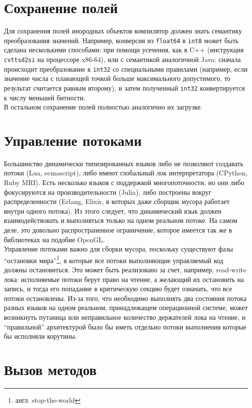 \documentclass[times,specification,annotation]{itmo-student-thesis}
\begin{document}
\section{Сохранение полей}
Для сохранения полей инородных объектов компилятор должен знать семантику преобразования значений. Например, конверсия из \texttt{float64} в \texttt{int8} может быть сделана несколькими способами: при помощи усечения, как в C++ (инструкция \texttt{cvttsd2si} на процессоре x86-64), или с семантикой аналогичной Java: сначала происходит преобразование к \texttt{int32} со специальными правилами (например, если значение числа с плавающей точкой больше максимального допустимого, то результат считается равным второму), и затем полученный \texttt{int32} конвертируется к числу меньшей битности.\\
В остальном сохранение полей полностью аналогично их загрузке.

\section{Управление потоками} \label{sec:thread-management}
Большинство динамически типизированных языков либо не позволяют создавать потоки (Lua, ecmascript), либо имеют глобальный лок интерпретатора (CPython, Ruby MRI). Есть несколько языков с поддержкой многопоточности, но они либо фокусируются на производительности (Julia), либо построены вокруг распределенности (Erlang, Elixir, в которых даже сборщик мусора работает внутри одного потока). Из этого следует, что динамический язык должен взаимодействовать и выполняться только на одном реальном потоке. На самом деле, это довольно распространенное ограничение, которое имеется так же в библиотеках на подобие OpenGL.\\
Управление потоками важно для сборки мусора, поскольку существуют фазы ``остановки мира''\footnote{англ. stop-the-world}, в которые все потоки выполняющие управляемый код должны остановиться. Это может быть реализовано за счет, например, read-write лока: исполняемые потоки берут право на чтение, а желающий их остановить на запись, и тогда его попадание в критическую секцию будет означать, что все потоки остановлены. Из-за того, что необходимо выполнять два состояния потока разных языков на одном реальном, принадлежащем операционной системе, может возникнуть путаница или неправильное количество держателей лока на чтение, и ``правильной'' архитектурой было бы иметь отдельно потоки выполнения которые бы исполняли корутины.

\section{Вызов методов}
\end{document}
